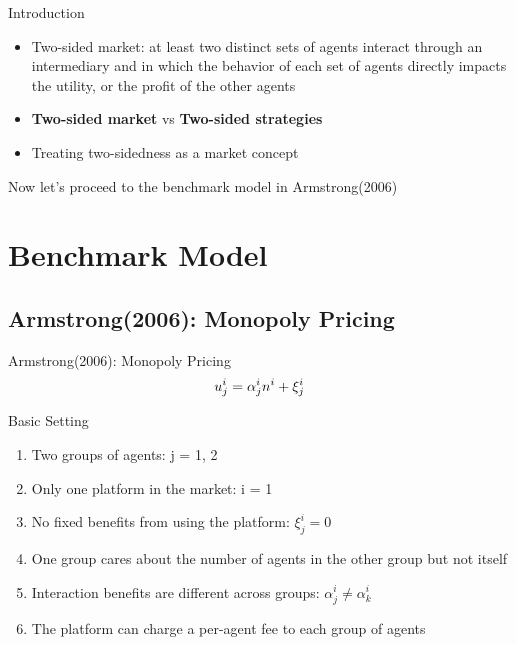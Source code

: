 \documentclass[aspectratio=169]{beamer}  %
\begin{document}
\begin{frame}{Introduction}
    \begin{itemize}        
        \item Two-sided market: at least two distinct sets of agents interact through an intermediary and in which the behavior of each set of agents directly impacts the utility, or the profit of the other agents
        \vspace{1em}
        \item \textbf{Two-sided market} vs \textbf{Two-sided strategies}
        \vspace{1em}
        \item Treating two-sidedness as a market concept
    \end{itemize}
    \vspace{2em}
\quad \quad Now let's proceed to the benchmark model in Armstrong(2006)
\end{frame}

\section{Benchmark Model}
\subsection{Armstrong(2006): Monopoly Pricing}
\begin{frame}{Armstrong(2006): Monopoly Pricing}
    \begin{equation*}
        \Large
        u_{j}^{i} = \alpha_{j}^{i} n^{i} + \xi_{j}^{i}
    \end{equation*}
    \begin{block}{Basic Setting}
        \begin{enumerate}
            \item Two groups of agents: j = 1, 2
            \item Only one platform in the market: i = 1
            \item No fixed benefits from using the platform: $\xi_{j}^{i} = 0$
            \item One group cares about the number of agents in the other group but not itself
            \item Interaction benefits are different across groups: $\alpha_{j}^{i} \neq \alpha_{k}^{i}$
            \item The platform can charge a per-agent fee to each group of agents
        \end{enumerate}
    \end{block}

\end{frame}
\end{document}
